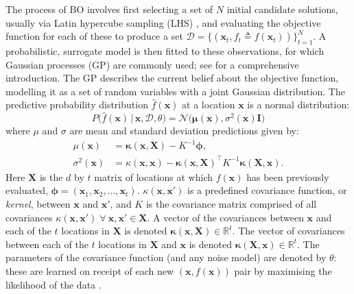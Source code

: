 \documentclass[conference]{IEEEtran}
\newcommand{\evaluatedx}{\bX}
\newcommand{\predict}{\hat{f}}
\newcommand{\ninitialevaluations}{N}
\newcommand{\nevaluations}{t}
\newcommand{\ndim}{d}
\newcommand\gp{GP\xspace}
\newcommand{\given}{\,|\,}
\newcommand{\bx}{\mathbf{x}}
\newcommand{\bX}{\mathbf{X}}
\newcommand{\bI}{\mathbf{I}}
\newcommand{\bmu}{\boldsymbol{\mu}}
\newcommand{\bphi}{\boldsymbol{\phi}}
\begin{document}
The process of BO %
involves first selecting a set of $\ninitialevaluations$ initial candidate solutions, usually via Latin hypercube sampling (LHS) \cite{mckay2000comparison}, and evaluating the objective function for each of these to produce a set $\mathcal{D} = \{ (\bx_t, f_t \triangleq f(\bx_t) )\}_{t=1}^{\ninitialevaluations}$.
A probabilistic, surrogate model is then fitted to these observations, for which  Gaussian processes (\gp) are commonly used; see \cite{rasmussen2003gaussian} for a comprehensive introduction.
The \gp describes the current belief about the objective function, modelling it as a set of random variables with a joint Gaussian distribution.  The predictive probability distribution $\predict(\bx)$ at a location $\bx$ is a normal distribution:
\begin{equation}\label{eqn:predictive_probability_distribution}
P\big(\predict(\mathbf{x}) \given \mathbf{x}, \mathcal{D}, \theta \big) = 
\mathcal{N}\big(\bmu(\mathbf{x}), \sigma^2(\mathbf{x})\bI\big)
\end{equation}
where $\mu$ and $\sigma$ are mean and standard deviation predictions given by:
\begin{align}\label{eqn: mu}
\mu(\mathbf{x}) &= \boldsymbol{\kappa}(\mathbf{x}, \evaluatedx) - K^{-1}  \bphi,\\
\label{eqn: sigma}
\sigma^2(\mathbf{x}) &= \kappa(\mathbf{x}, \mathbf{x}) - \boldsymbol{\kappa}(\mathbf{x}, \evaluatedx)^{\top}K^{-1} \boldsymbol{\kappa}(\evaluatedx, \mathbf{x}).
\end{align}
Here $\evaluatedx$ is the $\ndim$ by $\nevaluations$ matrix of locations at which $f(\bx)$ has
been previously evaluated, $\bphi = (\bx_1, \bx_2, \ldots, \bx_{\nevaluations})$.
$\kappa(\mathbf{x}, \mathbf{x}')$ is a predefined
covariance function, or  \textit{kernel}, between $\mathbf{x}$ and
$\mathbf{x}'$, and  $K$ is the covariance matrix comprised of all
covariances $\kappa(\mathbf{x}, \mathbf{x}') \; \forall \: \mathbf{x},
\mathbf{x}'\in \evaluatedx$. A vector of the covariances between
$\mathbf{x}$ and each of the $t$ locations in $\evaluatedx$ is denoted
$\boldsymbol{\kappa}(\mathbf{x}, \evaluatedx)\in \mathbb{R}^{t}$. The vector of covariances between each of the $t$ locations in
$\evaluatedx$ and $\mathbf{x}$ is denoted $\boldsymbol{\kappa}(\evaluatedx,
\mathbf{x}) \in \mathbb{R}^{t}$. The parameters of the covariance function
(and any noise model) are denoted by $\theta$: these are learned on receipt of each new $(\bx, f(\bx))$ pair by maximising the likelihood of the data \cite{rasmussen2003gaussian}. 
\end{document}
